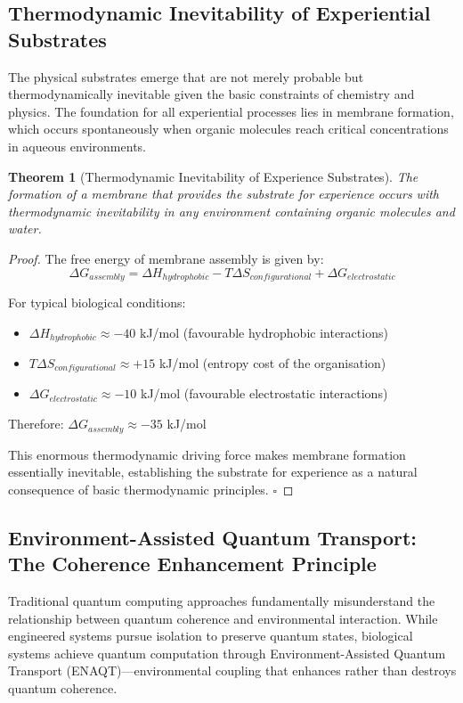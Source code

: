 \documentclass{article}
\newtheorem{theorem}{Theorem}[section]
\begin{document}
\subsection{Thermodynamic Inevitability of Experiential Substrates}

The physical substrates emerge that are not merely probable but thermodynamically inevitable given the basic constraints of chemistry and physics. The foundation for all experiential processes lies in membrane formation, which occurs spontaneously when organic molecules reach critical concentrations in aqueous environments.

\begin{theorem}[Thermodynamic Inevitability of Experience Substrates]
The formation of a membrane that provides the substrate for experience occurs with thermodynamic inevitability in any environment containing organic molecules and water.
\end{theorem}

\begin{proof}
The free energy of membrane assembly is given by:
$$\Delta G_{assembly} = \Delta H_{hydrophobic} - T\Delta S_{configurational} + \Delta G_{electrostatic}$$

For typical biological conditions:
\begin{itemize}
\item $\Delta H_{hydrophobic} \approx -40$ kJ/mol (favourable hydrophobic interactions)
\item $T\Delta S_{configurational} \approx +15$ kJ/mol (entropy cost of the organisation)
\item $\Delta G_{electrostatic} \approx -10$ kJ/mol (favourable electrostatic interactions)
\end{itemize}

Therefore: $\Delta G_{assembly} \approx -35$ kJ/mol

This enormous thermodynamic driving force makes membrane formation essentially inevitable, establishing the substrate for experience as a natural consequence of basic thermodynamic principles. $\square$
\end{proof}

\subsection{Environment-Assisted Quantum Transport: The Coherence Enhancement Principle}

Traditional quantum computing approaches fundamentally misunderstand the relationship between quantum coherence and environmental interaction. While engineered systems pursue isolation to preserve quantum states, biological systems achieve quantum computation through Environment-Assisted Quantum Transport (ENAQT)—environmental coupling that enhances rather than destroys quantum coherence.
\end{document}
